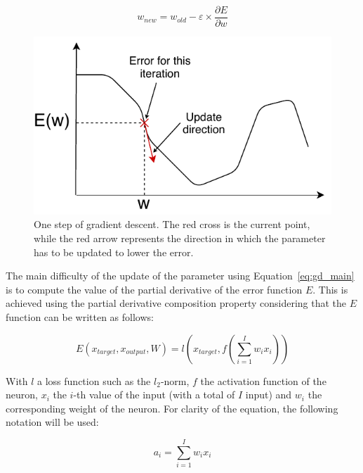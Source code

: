 \documentclass[a4paper]{report}
\begin{document}
\begin{equation}
    w_{new} = w_{old} - \varepsilon \times \frac{\partial E}{\partial w}
    \label{eq:gd_main}
\end{equation}

    \begin{figure}[h]
        \centering
        \includegraphics{gd}
        \caption{One step of gradient descent. The red cross is the current point, while the red arrow represents the direction in which the parameter has to be updated to lower the error.}
\label{fig:gd}
    \end{figure}

    The main difficulty of the update of the parameter using Equation~\ref{eq:gd_main} is to compute the value of the partial derivative of the error function $E$. This is achieved using the partial derivative composition property considering that the $E$ function can be written as follows:

    \begin{equation}
        E\left(x_{target}, x_{output}, W\right) = l\left(x_{target}, f\left(\sum_{i=1}^I w_i x_i\right)\right)
        \label{eq:error_function}
    \end{equation}

    With $l$ a loss function such as the $l_2$-norm, $f$ the activation function of the neuron, $x_i$ the $i$-th value of the input (with a total of $I$ input) and $w_i$ the corresponding weight of the neuron. For clarity of the equation, the following notation will be used:

    \begin{equation}
        a_i = \sum_{i=1}^I w_i x_i
        \label{eq:weighted_sum}
    \end{equation}
\end{document}
